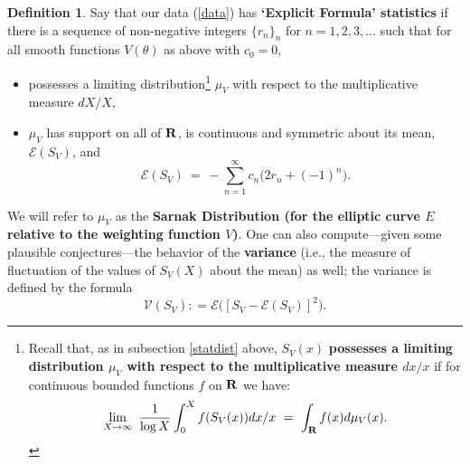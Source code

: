 \documentclass[11pt]{article}
\theoremstyle{plain}
\theoremstyle{definition}
\newtheorem{definition}[theorem]{Definition}
\numberwithin{equation}{section}
\numberwithin{figure}{section}
\numberwithin{table}{section}
\begin{document}
\begin{definition} Say that our data (\ref{data}) has {\bf `Explicit Formula' statistics} if there is a sequence of non-negative integers $\{r_n\}_n$  for $n=1,2,3, \dots$ such that for all smooth functions $V(\theta)$ as above with $c_0=0$,
\begin{itemize}
\item
possesses a limiting distribution{\footnote{\label{footnote:statdist} Recall that, as in subsection    \ref{statdist} above,  $S_V(x)$ {\bf possesses a limiting distribution $\mu_V$ with respect to the multiplicative measure $dx/x$} if for continuous bounded functions $f$ on ${\bf R}$ we have:
\begin{equation}
\lim_{X \to {\infty}}\ {\frac{1}{\log X}}\int_0^Xf(S_V(x))dx/x \ = \ \int_{\bf R}f(x)d\mu_V(x).
\end{equation}}}
 $\mu_V$ with respect to the multiplicative measure $dX/X$,
\item  $\mu_V$ has support on all of ${\bf R}$, is continuous and symmetric about its mean, ${\mathcal E}(S_V)$, and
\begin{equation}\label{eqnmean}
{\mathcal E}(S_V)\ = \ -\sum_{n=1}^{\infty}  c_n\big(2r_n+(-1)^n\big).
\end{equation}
\end{itemize}
\end{definition}
We will refer to $\mu_V$  as the {\bf Sarnak Distribution  (for the elliptic curve $E$ relative to the weighting function $V$)}.
One can also compute---given some plausible conjectures---the behavior of the {\bf variance}  (i.e., the measure of fluctuation of the values of $S_V(X)$ about the mean) as well; the variance is defined by the formula  $${\mathcal V}(S_V): = {\mathcal E}\big([S_V  - {\mathcal E}(S_V)]^2\big).$$
\end{document}
